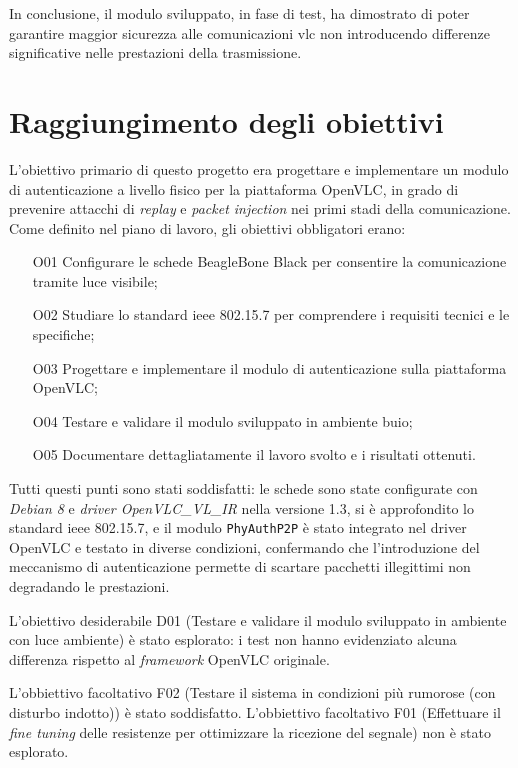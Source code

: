 In conclusione, il modulo sviluppato, in fase di test, ha dimostrato di poter garantire maggior sicurezza alle comunicazioni \gls{vlc} non introducendo differenze significative nelle prestazioni della trasmissione.\\

\section{Raggiungimento degli obiettivi}
L'obiettivo primario di questo progetto era progettare e implementare un modulo di autenticazione a livello fisico per la piattaforma OpenVLC, in grado di prevenire attacchi di \textit{replay} e \textit{packet injection} nei primi stadi della comunicazione. Come definito nel piano di lavoro, gli obiettivi obbligatori erano:
\begin{itemize}
  \item[O01] Configurare le schede BeagleBone Black per consentire la comunicazione tramite luce visibile;
  \item[O02] Studiare lo standard \gls{ieee} 802.15.7 per comprendere i requisiti tecnici e le specifiche;
  \item[O03] Progettare e implementare il modulo di autenticazione sulla piattaforma OpenVLC;
  \item[O04] Testare e validare il modulo sviluppato in ambiente buio;
  \item[O05] Documentare dettagliatamente il lavoro svolto e i risultati ottenuti.
\end{itemize}
Tutti questi punti sono stati soddisfatti: le schede sono state configurate con \textit{Debian 8} e \textit{driver OpenVLC\_VL\_IR} nella versione 1.3, si è approfondito lo standard \gls{ieee} 802.15.7, e il modulo \texttt{PhyAuthP2P} è stato integrato nel driver OpenVLC e testato in diverse condizioni, confermando che l'introduzione del meccanismo di autenticazione permette di scartare pacchetti illegittimi non degradando le prestazioni.

L'obiettivo desiderabile D01 (Testare e validare il modulo sviluppato in ambiente con luce ambiente) è stato esplorato: i test non hanno evidenziato alcuna differenza rispetto al \textit{framework} OpenVLC originale.

L'obbiettivo facoltativo F02 (Testare il sistema in condizioni più rumorose (con disturbo indotto)) è stato soddisfatto.
L'obbiettivo facoltativo F01 (Effettuare il \textit{fine tuning} delle resistenze per ottimizzare la ricezione del segnale) non è stato esplorato.

